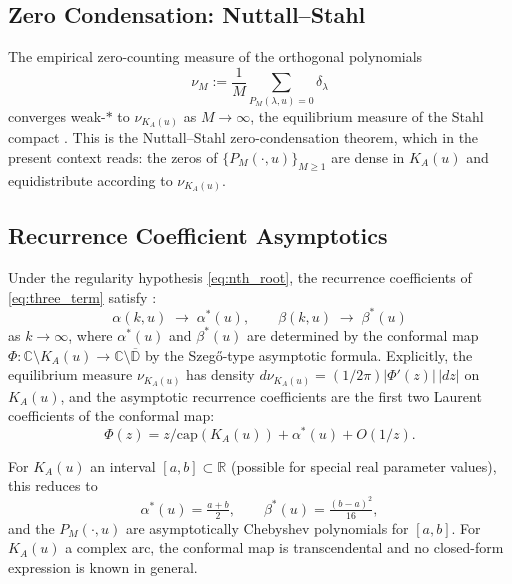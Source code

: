 \documentclass{article}
\newcommand{\C}{\mathbb{C}}
\newcommand{\R}{\mathbb{R}}
\begin{document}
\subsection{Zero Condensation: Nuttall--Stahl}

The empirical zero-counting measure of the orthogonal polynomials
\begin{equation}\label{eq:nu_M}
  \nu_M := \frac{1}{M}\sum_{P_M(\lambda,u)=0}\delta_\lambda
\end{equation}
converges weak-$*$ to $\nu_{K_A(u)}$ as $M\to\infty$, the equilibrium
measure of the Stahl compact \cite{Crowley2026,Stahl1997}. This is the
Nuttall--Stahl zero-condensation theorem, which in the present context
reads: the zeros of $\{P_M(\cdot, u)\}_{M\ge 1}$ are dense in $K_A(u)$
and equidistribute according to $\nu_{K_A(u)}$.

\subsection{Recurrence Coefficient Asymptotics}

Under the regularity hypothesis \eqref{eq:nth_root}, the recurrence
coefficients of \eqref{eq:three_term} satisfy \cite{StahlTotik1992}:
\begin{equation}\label{eq:alpha_asymp}
  \alpha(k, u) \;\longrightarrow\; \alpha^*(u), \qquad
  \beta(k, u) \;\longrightarrow\; \beta^*(u)
\end{equation}
as $k \to \infty$, where $\alpha^*(u)$ and $\beta^*(u)$ are determined by
the conformal map $\Phi: \C\setminus K_A(u) \to \C\setminus\overline{\mathbb{D}}$
by the Szegő-type asymptotic formula. Explicitly, the equilibrium measure
$\nu_{K_A(u)}$ has density $d\nu_{K_A(u)} = (1/2\pi)|\Phi'(z)|\,|dz|$ on
$K_A(u)$, and the asymptotic recurrence coefficients are the first two
Laurent coefficients of the conformal map:
\begin{equation}\label{eq:alpha_beta_conformal}
  \Phi(z) = z/\mathrm{cap}(K_A(u)) + \alpha^*(u) + O(1/z).
\end{equation}

For $K_A(u)$ an interval $[a,b] \subset \R$ (possible for special real
parameter values), this reduces to
\begin{equation}\label{eq:interval_case}
  \alpha^*(u) = \tfrac{a+b}{2}, \qquad \beta^*(u) = \tfrac{(b-a)^2}{16},
\end{equation}
and the $P_M(\cdot,u)$ are asymptotically Chebyshev polynomials for $[a,b]$.
For $K_A(u)$ a complex arc, the conformal map is transcendental and no
closed-form expression is known in general.
\end{document}

